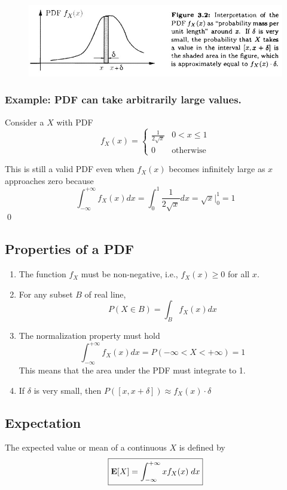  \begin{figure}[h]
    \center
    \includegraphics[width=.8\textwidth]{images/P_pdf_interpret.jpeg}
 \end{figure}

 \subsubsection{Example: PDF can take arbitrarily large values.}
 Consider  a \rv $X$ with PDF
 \[f_X(x) = \begin{cases}
     \frac{1}{2\sqrt{x}} & 0 < x \le 1 \\
     0 & \text{otherwise}
 \end{cases}\]

 This is still a valid PDF even when $f_X(x)$ becomes infinitely large as $x$ approaches zero because
 \[\int_{-\infty}^{+\infty}f_X(x) dx = \int_0^1 \frac{1}{2\sqrt{x}} dx = \sqrt{x}\Bigr|_0^1 = 1\] \qed

 \subsection{Properties of a PDF}
 \begin{enumerate}
     \item The function $f_X$ must be non-negative, i.e., $f_X(x) \ge 0$ for all $x$.
     \item For any subset $B$ of real line,
     \[P(X \in B) = \int_B f_X(x) dx\]
     \item The normalization property must hold
     \[\int_{-\infty}^{+\infty}f_X(x) dx=P(-\infty < X < +\infty) = 1\]
     This means that the area under the PDF must integrate to 1.
     \item If $\delta$ is very small, then $P([x,x+\delta]) \approx f_X(x) \cdot \delta$
 \end{enumerate}

 \subsection{Expectation}
 The expected value or mean of a continuous \rv $X$ is defined by
 \[ \boxed{\operatorname{\textbf{E}} [X] = \int_{-\infty}^{+\infty}xf_X(x) \; dx }\]

